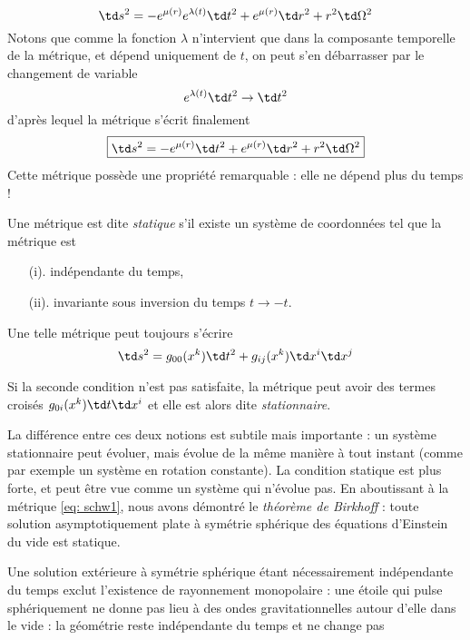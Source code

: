 \begin{equation}
    \td s^2 = - e^{\mu(r)} e^{\lambda (t)} \td t^2 + e^{\mu(r)} \td r^2 + r^2 \td \Omega^2
\end{equation}
Notons que comme la fonction $\lambda$ n'intervient que dans la composante temporelle de la métrique, et dépend uniquement de $t$, on peut s'en débarrasser par le changement de variable 
\begin{equation}
    e^{\lambda(t)} \td t^2 \to \td t^2
\end{equation}
d'après lequel la métrique s'écrit finalement
\begin{equation}
    \label{eq: schw1}
    \boxed{\td s^2 = - e^{\mu(r)} \td t^2 + e^{\mu(r)} \td r^2 + r^2 \td \Omega^2}
\end{equation}
Cette métrique possède une propriété remarquable : elle ne dépend plus du temps !
\begin{theoremframe}
    \begin{defi}
        Une métrique est dite \emph{statique} s'il existe un système de coordonnées tel que la métrique est
        \begin{enumerate}
            \item[(i).] indépendante du temps,
            \item[(ii).] invariante sous inversion du temps $t \to -t$.
        \end{enumerate}
    \end{defi}
\end{theoremframe}
Une telle métrique peut toujours s'écrire 
\begin{equation}
    \td s^2 = g_{00}(x^k) \td t^2 + g_{ij} (x^k) \td x^i \td x^j
\end{equation}
\begin{rmk}
    Si la seconde condition n'est pas satisfaite, la métrique peut avoir des termes croisés $g_{0i} (x^k) \td t \td x^i$ et elle est alors dite \emph{stationnaire}.
\end{rmk}
La différence entre ces deux notions est subtile mais importante : un système stationnaire peut évoluer, mais évolue de la même manière à tout instant (comme par exemple un système en rotation constante). La condition statique est plus forte, et peut être vue comme un système qui n'évolue pas. En aboutissant à la métrique \ref{eq: schw1}, nous avons démontré le \emph{théorème de Birkhoff} : toute solution asymptotiquement plate à symétrie sphérique des équations d'Einstein du vide est statique.
\begin{rmk}
    Une solution extérieure à symétrie sphérique étant nécessairement indépendante du temps exclut l'existence de rayonnement monopolaire : une étoile qui pulse sphériquement ne donne pas lieu à des ondes gravitationnelles autour d'elle dans le vide : la géométrie reste indépendante du temps et ne change pas
\end{rmk}
